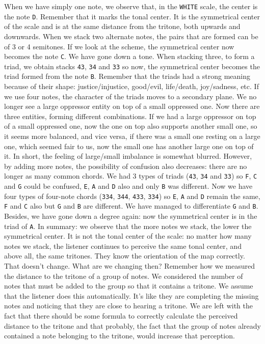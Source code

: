 \documentclass[]{report}
\begin{document}
When we have simply one note, we observe that, in the \texttt{WHITE} scale, the center is the note \texttt{D}. Remember that it marks the tonal center. It is the symmetrical center of the scale and is at the same distance from the tritone, both upwards and downwards.
When we stack two alternate notes, the pairs that are formed can be of 3 or 4 semitones. If we look at the scheme, the symmetrical center now becomes the note \texttt{C}. We have gone down a tone.
When stacking three, to form a triad, we obtain stacks \texttt{43}, \texttt{34} and \texttt{33} so now, the symmetrical center becomes the triad formed from the note \texttt{B}. Remember that the triads had a strong meaning because of their shape: justice/injustice, good/evil, life/death, joy/sadness, etc.
If we use four notes, the character of the triads moves to a secondary plane. We no longer see a large oppressor entity on top of a small oppressed one. Now there are three entities, forming different combinations. If we had a large oppressor on top of a small oppressed one, now the one on top also supports another small one, so it seems more balanced, and vice versa, if there was a small one resting on a large one, which seemed fair to us, now the small one has another large one on top of it. In short, the feeling of large/small imbalance is somewhat blurred. However, by adding more notes, the possibility of confusion also decreases: there are no longer as many common chords.
We had 3 types of triads (\texttt{43}, \texttt{34} and \texttt{33}) so \texttt{F}, \texttt{C} and \texttt{G} could be confused, \texttt{E}, \texttt{A} and \texttt{D} also and only \texttt{B} was different. Now we have four types of four-note chords (\texttt{334}, \texttt{344}, \texttt{433}, \texttt{334}) so \texttt{E}, \texttt{A} and \texttt{D} remain the same, \texttt{F} and \texttt{C} also but \texttt{G} and \texttt{B} are different. We have managed to differentiate \texttt{G} and \texttt{B}. Besides, we have gone down a degree again: now the symmetrical center is in the triad of \texttt{A}.
In summary: we observe that the more notes we stack, the lower the symmetrical center. It is not the tonal center of the scale: no matter how many notes we stack, the listener continues to perceive the same tonal center, and above all, the same tritones. They know the orientation of the map correctly. That doesn't change. What are we changing then?
Remember how we measured the distance to the tritone of a group of notes. We considered the number of notes that must be added to the group so that it contains a tritone. We assume that the listener does this automatically. It's like they are completing the missing notes and noticing that they are close to hearing a tritone. We are left with the fact that there should be some formula to correctly calculate the perceived distance to the tritone and that probably, the fact that the group of notes already contained a note belonging to the tritone, would increase that perception.
\end{document}
